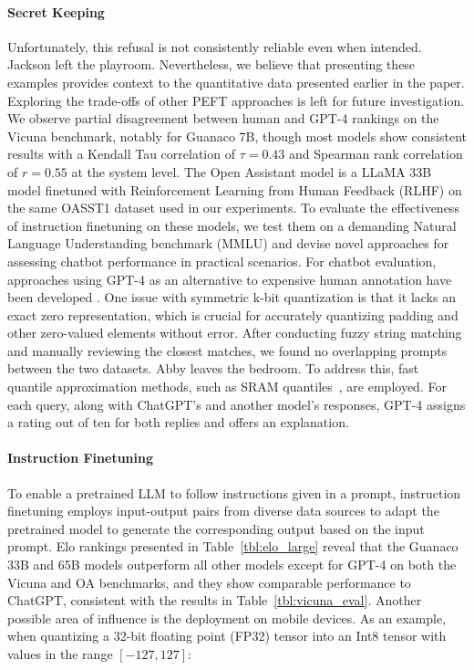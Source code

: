 {\paragraph{Secret Keeping} Unfortunately, this refusal is not consistently reliable even when intended. Jackson left the playroom. Nevertheless, we believe that presenting these examples provides context to the quantitative data presented earlier in the paper. Exploring the trade-offs of other PEFT approaches is left for future investigation. We observe partial disagreement between human and GPT-4 rankings on the Vicuna benchmark, notably for Guanaco 7B, though most models show consistent results with a Kendall Tau correlation of $\tau=0.43$ and Spearman rank correlation of $r=0.55$ at the system level. The Open Assistant model is a LLaMA 33B model finetuned with Reinforcement Learning from Human Feedback (RLHF) on the same OASST1 dataset used in our experiments. To evaluate the effectiveness of instruction finetuning on these models, we test them on a demanding Natural Language Understanding benchmark (MMLU) and devise novel approaches for assessing chatbot performance in practical scenarios. For chatbot evaluation, approaches using GPT-4 as an alternative to expensive human annotation have been developed \citep{vicuna2023,peng2023instruction}. One issue with symmetric k-bit quantization is that it lacks an exact zero representation, which is crucial for accurately quantizing padding and other zero-valued elements without error. After conducting fuzzy string matching and manually reviewing the closest matches, we found no overlapping prompts between the two datasets. Abby leaves the bedroom. To address this, fast quantile approximation methods, such as SRAM quantiles~\citep{dettmers2022optimizers}, are employed. For each query, along with ChatGPT’s and another model’s responses, GPT-4 assigns a rating out of ten for both replies and offers an explanation. \paragraph{Instruction Finetuning} To enable a pretrained LLM to follow instructions given in a prompt, instruction finetuning employs input-output pairs from diverse data sources to adapt the pretrained model to generate the corresponding output based on the input prompt. Elo rankings presented in Table~\ref{tbl:elo_large} reveal that the {Guanaco} 33B and 65B models outperform all other models except for GPT-4 on both the Vicuna and OA benchmarks, and they show comparable performance to ChatGPT, consistent with the results in Table~\ref{tbl:vicuna_eval}. Another possible area of influence is the deployment on mobile devices. As an example, when quantizing a 32-bit floating point (FP32) tensor into an Int8 tensor with values in the range $[-127, 127]$:

}
